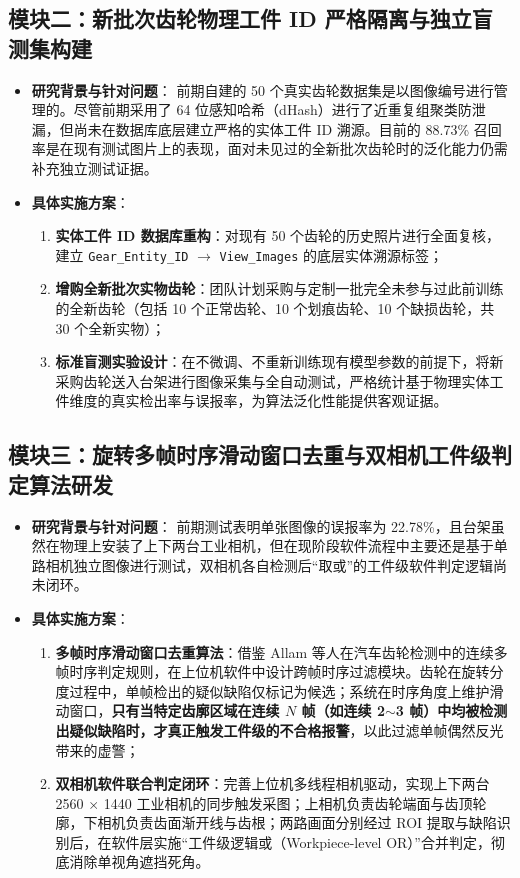 \subsection*{模块二：新批次齿轮物理工件 ID 严格隔离与独立盲测集构建}
\begin{itemize}
    \item \textbf{研究背景与针对问题}：
    前期自建的 50 个真实齿轮数据集是以图像编号进行管理的。尽管前期采用了 64 位感知哈希（dHash）进行了近重复组聚类防泄漏，但尚未在数据库底层建立严格的实体工件 ID 溯源。目前的 88.73\% 召回率是在现有测试图片上的表现，面对未见过的全新批次齿轮时的泛化能力仍需补充独立测试证据。
    \item \textbf{具体实施方案}：
    \begin{enumerate}
        \item \textbf{实体工件 ID 数据库重构}：对现有 50 个齿轮的历史照片进行全面复核，建立 \texttt{Gear\_Entity\_ID} $\rightarrow$ \texttt{View\_Images} 的底层实体溯源标签；
        \item \textbf{增购全新批次实物齿轮}：团队计划采购与定制一批完全未参与过此前训练的全新齿轮（包括 10 个正常齿轮、10 个划痕齿轮、10 个缺损齿轮，共 30 个全新实物）；
        \item \textbf{标准盲测实验设计}：在不微调、不重新训练现有模型参数的前提下，将新采购齿轮送入台架进行图像采集与全自动测试，严格统计基于物理实体工件维度的真实检出率与误报率，为算法泛化性能提供客观证据。
    \end{enumerate}
\end{itemize}

\subsection*{模块三：旋转多帧时序滑动窗口去重与双相机工件级判定算法研发}
\begin{itemize}
    \item \textbf{研究背景与针对问题}：
    前期测试表明单张图像的误报率为 22.78\%，且台架虽然在物理上安装了上下两台工业相机，但在现阶段软件流程中主要还是基于单路相机独立图像进行测试，双相机各自检测后“取或”的工件级软件判定逻辑尚未闭环。
    \item \textbf{具体实施方案}：
    \begin{enumerate}
        \item \textbf{多帧时序滑动窗口去重算法}：借鉴 Allam 等人在汽车齿轮检测中的连续多帧时序判定规则，在上位机软件中设计跨帧时序过滤模块。齿轮在旋转分度过程中，单帧检出的疑似缺陷仅标记为候选；系统在时序角度上维护滑动窗口，\textbf{只有当特定齿廓区域在连续 $N$ 帧（如连续 2$\sim$3 帧）中均被检测出疑似缺陷时，才真正触发工件级的不合格报警}，以此过滤单帧偶然反光带来的虚警；
        \item \textbf{双相机软件联合判定闭环}：完善上位机多线程相机驱动，实现上下两台 2560 $\times$ 1440 工业相机的同步触发采图；上相机负责齿轮端面与齿顶轮廓，下相机负责齿面渐开线与齿根；两路画面分别经过 ROI 提取与缺陷识别后，在软件层实施“工件级逻辑或（Workpiece-level OR）”合并判定，彻底消除单视角遮挡死角。
    \end{enumerate}
\end{itemize}

